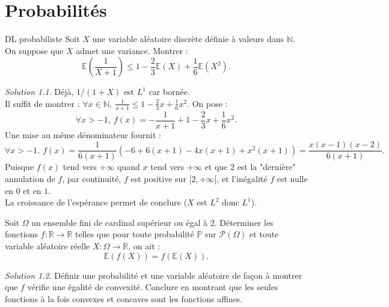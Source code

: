 \documentclass[french]{book}
\renewcommand{\P}{\mathbb{P}}
\newcommand{\N}{\mathbb{N}}
\newcommand{\R}{\mathbb{R}}
\newcommand{\E}{\mathbb{E}}
\theoremstyle{definition}
\theoremstyle{remark}
\newtheorem*{sol}{Solution}
\begin{document}
\chapter{Probabilités}

\begin{exo}[0]{DL probabiliste}
	Soit $X$ une variable aléatoire discrète définie à valeurs dans $\N$. On suppose que $X$ admet une variance. Montrer :
	$$\E\left(\frac{1}{X+1}\right)\leqslant1-\frac{2}{3}\E(X)+\frac{1}{6}\E(X^2).$$
\end{exo}
\begin{sol}
	Déjà, $1/(1+X)$ est $L^1$ car bornée. \\
	Il suffit de montrer : $\forall x\in\N,\ \displaystyle\frac{1}{x+1}\leqslant1-\frac{2}{3}x+\frac{1}{6}x^2$. On pose :
	$$\forall x>-1,\ f(x)=-\frac{1}{x+1}+1-\frac{2}{3}x+\frac{1}{6}x^2.$$
	Une mise au même dénominateur fournit :
	$$\forall x>-1,\ f(x)=\frac{1}{6(x+1)}\left(-6+6(x+1)-4x(x+1)+x^2(x+1)\right)=\frac{x(x-1)(x-2)}{6(x+1)}.$$
	Puisque $f(x)$ tend vers $+\infty$ quand $x$ tend vers $+\infty$ et que $2$ est la "dernière" annulation de $f$, par continuité, $f$ est positive sur $[2,+\infty[$, et l'inégalité $f$ est nulle en $0$ et en $1$. \\
	La croissance de l'espérance permet de conclure ($X$ est $L^2$ donc $L^1$).
\end{sol}

\begin{exo}[1]{}
	Soit $\Omega$ un ensemble fini de cardinal supérieur ou égal à $2$. Déterminer les fonctions $f:\R\to\R$ telles que pour toute probabilité $\P$ sur $\mathcal{P}(\Omega)$ et toute variable aléatoire réelle $X:\Omega\to\R$, on ait :
	$$\E(f(X))=f(\E(X)).$$
\end{exo}
\begin{sol}
	Définir une probabilité et une variable aléatoire de façon à montrer que $f$ vérifie une égalité de convexité. Conclure en montrant que les seules fonctions à la fois convexes et concaves sont les fonctions affines.
\end{sol}
\end{document}
